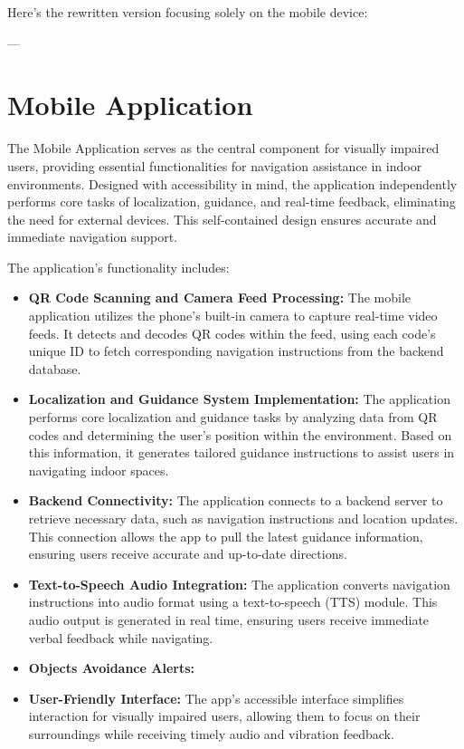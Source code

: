 Here’s the rewritten version focusing solely on the mobile device:

---

\section{Mobile Application}

The Mobile Application serves as the central component for visually impaired users, providing essential functionalities for navigation assistance in indoor environments. Designed with accessibility in mind, the application independently performs core tasks of localization, guidance, and real-time feedback, eliminating the need for external devices. This self-contained design ensures accurate and immediate navigation support.

The application’s functionality includes:

\begin{itemize}
	\item \textbf{QR Code Scanning and Camera Feed Processing:} The mobile application utilizes the phone’s built-in camera to capture real-time video feeds. It detects and decodes QR codes within the feed, using each code’s unique ID to fetch corresponding navigation instructions from the backend database.
	
	\item \textbf{Localization and Guidance System Implementation:} The application performs core localization and guidance tasks by analyzing data from QR codes and determining the user’s position within the environment. Based on this information, it generates tailored guidance instructions to assist users in navigating indoor spaces.
	
	\item \textbf{Backend Connectivity:} The application connects to a backend server to retrieve necessary data, such as navigation instructions and location updates. This connection allows the app to pull the latest guidance information, ensuring users receive accurate and up-to-date directions.
	
	\item \textbf{Text-to-Speech Audio Integration:} The application converts navigation instructions into audio format using a text-to-speech (TTS) module. This audio output is generated in real time, ensuring users receive immediate verbal feedback while navigating.
	
	\item \textbf{Objects Avoidance Alerts:} 
	
	\item \textbf{User-Friendly Interface:} The app’s accessible interface simplifies interaction for visually impaired users, allowing them to focus on their surroundings while receiving timely audio and vibration feedback.
	
\end{itemize}

